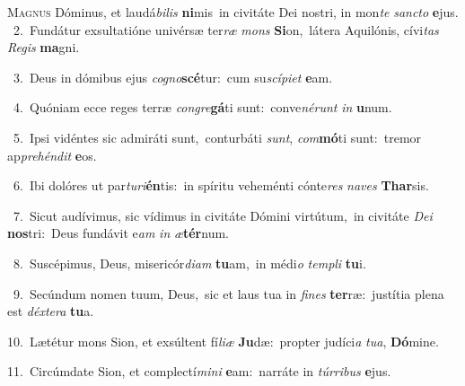\lettrine{\initial\textcolor{\initialcolor}{M}}{agnus} Dóminus, et laudá\-\textit{bi}\-\textit{lis} \textbf{ni}\-mis~\star in civitáte Dei nostri, in mon\textit{te} \textit{sanc}\-\textit{to} \textbf{e}\-jus.\\
{\numbfont\textcolor{\numbcolor}{~2.}}~Fundátur exsultatióne univérsæ ter\textit{ræ} \textit{mons} \textbf{Si}\-on,~\star látera Aquilónis, cívi\textit{tas} \textit{Re}\-\textit{gis} \textbf{ma}\-gni.\par
{\numbfont\textcolor{\numbcolor}{~3.}}~Deus in dómibus ejus \textit{co}\-\textit{gno}\textbf{scé}tur:~\star cum su\-\textit{scí}\-\textit{pi}\textit{et} \textbf{e}\-am.\par
{\numbfont\textcolor{\numbcolor}{~4.}}~Quóniam ecce reges terræ \textit{con}\-\textit{gre}\textbf{gá}ti sunt:~\star conve\-\textit{né}\-\textit{runt} \textit{in} \textbf{u}\-num.\par
{\numbfont\textcolor{\numbcolor}{~5.}}~Ipsi vidéntes sic admiráti sunt,~\dagger conturbáti \textit{sunt}\-, \textit{com}\-\textbf{mó}ti sunt:~\star tremor ap\-\textit{pre}\-\textit{hén}\textit{dit} \textbf{e}\-os.\par
{\numbfont\textcolor{\numbcolor}{~6.}}~Ibi dolóres ut par\-\textit{tu}\-\textit{ri}\textbf{én}tis:~\star in spíritu veheménti cónte\textit{res} \textit{na}\-\textit{ves} \textbf{Thar}\-sis.\par
{\numbfont\textcolor{\numbcolor}{~7.}}~Sicut audívimus, sic vídimus in civitáte Dómini virtútum,~\dagger in civitáte \textit{De}\-\textit{i} \textbf{nos}\-tri:~\star Deus fundávit e\textit{am} \textit{in} \textit{æ}\-\textbf{tér}num.\par
{\numbfont\textcolor{\numbcolor}{~8.}}~Suscépimus, Deus, misericór\-\textit{di}\-\textit{am} \textbf{tu}\-am,~\star in médi\textit{o} \textit{tem}\-\textit{pli} \textbf{tu}\-i.\par
{\numbfont\textcolor{\numbcolor}{~9.}}~Secúndum nomen tuum, Deus,~\dagger sic et laus tua in \textit{fi}\-\textit{nes} \textbf{ter}\-ræ:~\star justítia plena est \textit{déx}\-\textit{te}\textit{ra} \textbf{tu}\-a.\par
{\numbfont\textcolor{\numbcolor}{10.}}~Lætétur mons Sion, et exsúltent fí\-\textit{li}\-\textit{æ} \textbf{Ju}\-dæ:~\star propter judíci\textit{a} \textit{tu}\-\textit{a}, \textbf{Dó}\-mine.\par
{\numbfont\textcolor{\numbcolor}{11.}}~Circúmdate Sion, et complectí\-\textit{mi}\-\textit{ni} \textbf{e}\-am:~\star narráte in \textit{túr}\-\textit{ri}\textit{bus} \textbf{e}\-jus.\par
